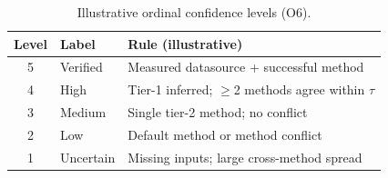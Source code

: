 \begin{table}[t]
  \centering
  \caption{Illustrative ordinal confidence levels (O6).}
  \label{tab:confidence}
  \small
  \begin{tabular}{clp{4.5cm}}
    \toprule
    Level & Label & Rule (illustrative) \\
    \midrule
    5 & Verified & Measured datasource + successful method \\
    4 & High & Tier-1 inferred; $\geq$2 methods agree within $\tau$ \\
    3 & Medium & Single tier-2 method; no conflict \\
    2 & Low & Default method or method conflict \\
    1 & Uncertain & Missing inputs; large cross-method spread \\
    \bottomrule
  \end{tabular}
\end{table}
